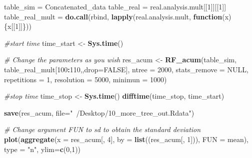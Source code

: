 \documentclass[]{book}
\newenvironment{Shaded}{\begin{snugshade}}{\end{snugshade}}
\newcommand{\KeywordTok}[1]{\textcolor[rgb]{0.13,0.29,0.53}{\textbf{{#1}}}}
\newcommand{\DataTypeTok}[1]{\textcolor[rgb]{0.13,0.29,0.53}{{#1}}}
\newcommand{\DecValTok}[1]{\textcolor[rgb]{0.00,0.00,0.81}{{#1}}}
\newcommand{\StringTok}[1]{\textcolor[rgb]{0.31,0.60,0.02}{{#1}}}
\newcommand{\CommentTok}[1]{\textcolor[rgb]{0.56,0.35,0.01}{\textit{{#1}}}}
\newcommand{\OtherTok}[1]{\textcolor[rgb]{0.56,0.35,0.01}{{#1}}}
\newcommand{\ControlFlowTok}[1]{\textcolor[rgb]{0.13,0.29,0.53}{\textbf{{#1}}}}
\newcommand{\OperatorTok}[1]{\textcolor[rgb]{0.81,0.36,0.00}{\textbf{{#1}}}}
\newcommand{\NormalTok}[1]{{#1}}
\theoremstyle{definition}
\theoremstyle{definition}
\theoremstyle{definition}
\theoremstyle{remark}
\begin{document}
\begin{Shaded}
\begin{Highlighting}[]
\NormalTok{table_sim =}\StringTok{ }\NormalTok{Concatenated_data}
\NormalTok{table_real =}\StringTok{ }\NormalTok{real.analysis.mult[[}\DecValTok{1}\NormalTok{]][[}\DecValTok{1}\NormalTok{]]}
\NormalTok{table_real_mult =}\StringTok{ }\KeywordTok{do.call}\NormalTok{(rbind, }\KeywordTok{lapply}\NormalTok{(real.analysis.mult, }
                                       \ControlFlowTok{function}\NormalTok{(x)\{x[[}\DecValTok{1}\NormalTok{]]\}))}

\CommentTok{#start time}
\NormalTok{time_start <-}\StringTok{ }\KeywordTok{Sys.time}\NormalTok{()}

\CommentTok{# Change the parameters as you wish}
\NormalTok{res_acum <-}\StringTok{ }\KeywordTok{RF_acum}\NormalTok{(table_sim, table_real_mult[}\DecValTok{100}\OperatorTok{:}\DecValTok{110}\NormalTok{,,}\DataTypeTok{drop=}\OtherTok{FALSE}\NormalTok{], }\DataTypeTok{ntree =} \DecValTok{2000}\NormalTok{, }
                   \DataTypeTok{stats_remove =} \OtherTok{NULL}\NormalTok{, }\DataTypeTok{repetitions =} \DecValTok{1}\NormalTok{,}
                   \DataTypeTok{resolution =} \DecValTok{5000}\NormalTok{, }\DataTypeTok{minimun =} \DecValTok{1000}\NormalTok{)}
                   
\CommentTok{#stop time}
\NormalTok{time_stop <-}\StringTok{ }\KeywordTok{Sys.time}\NormalTok{()}
\KeywordTok{difftime}\NormalTok{(time_stop, time_start)                   }

\KeywordTok{save}\NormalTok{(res_acum, }\DataTypeTok{file=}\StringTok{"~/Desktop/10_more_tree_out.Rdata"}\NormalTok{)}

\CommentTok{# Change argument FUN to sd to obtain the standard deviation}
\KeywordTok{plot}\NormalTok{(}\KeywordTok{aggregate}\NormalTok{(}\DataTypeTok{x =}\NormalTok{ res_acum[, }\DecValTok{4}\NormalTok{], }\DataTypeTok{by =} \KeywordTok{list}\NormalTok{((res_acum[, }\DecValTok{1}\NormalTok{])), }\DataTypeTok{FUN =}\NormalTok{ mean), }\DataTypeTok{type =} \StringTok{"n"}\NormalTok{, }\DataTypeTok{ylim=}\KeywordTok{c}\NormalTok{(}\DecValTok{0}\NormalTok{,}\DecValTok{1}\NormalTok{))}


\end{Highlighting}
\end{Shaded}
\end{document}

